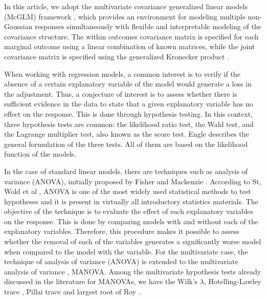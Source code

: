 \documentclass[AMA,STIX1COL]{WileyNJD-v2}
\begin{document}
In this article, we adopt the multivariate covariance generalized linear models (McGLM) framework \cite{Bonat16}, which provides an environment for modeling multiple non-Gaussian responses simultaneously with flexible and interpretable modeling of the covariance structure. The within outcomes covariance matrix is specified for each marginal outcome using a linear combination of known matrices, while the joint covariance matrix is specified using the generalized Kronecker product \cite{martinez13,Bonat16}.


When working with regression models, a common interest is to verify if the absence of a certain explanatory variable of the model would generate a loss in the adjustment. Thus, a conjecture of interest is to assess whether there is sufficient evidence in the data to state that a given explanatory variable has no effect on the response. This is done through hypothesis testing. In this context, three hypothesis tests are common: the likelihood ratio test, the Wald test, and the Lagrange multiplier test, also known as the score test. Engle \cite{engle} describes the general formulation of the three tests. All of them are based on the likelihood function of the models. 


In the case of standard linear models, there are techniques such as analysis of variance (ANOVA), initially proposed by Fisher and Mackenzie \cite{anova_fisher}. According to St, Wold et al \cite{anova1}, ANOVA is one of the most widely used statistical methods to test hypotheses and it is present in virtually all introductory statistics materials. The objective of the technique is to evaluate the effect of each explanatory variables on the response. This is done by comparing models with and without each of the explanatory variables. Therefore, this procedure makes it possible to assess whether the removal of each of the variables generates a significantly worse model when compared to the model with the variable. For the multivariate case, the technique of analysis of variance (ANOVA) is extended to the multivariate analysis of variance \citep{manova}, MANOVA. Among the multivariate hypothesis tests already discussed in the literature for MANOVAs, we have the Wilk's \cite{wilks} $\lambda$, Hotelling-Lawley trace \cite{lawley,hotelling}, Pillai trace \cite{pillai} and largest root of Roy \cite{roy}. 

\end{document}
